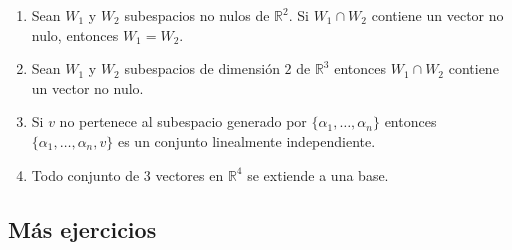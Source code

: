 \documentclass[12pt]{amsart}
\begin{document}
\begin{enumerate}
\begin{enumerate}
	\item Sean $W_1$ y $W_2$ subespacios no nulos de $\mathbb{R}^2$.  Si $W_1 \cap W_2$ contiene un vector no nulo, entonces $W_1 = W_2$.
	\item Sean $W_1$ y $W_2$ subespacios de dimensi\'on $2$ de $\mathbb{R}^3$ entonces $W_1 \cap W_2$ contiene un vector no nulo.
	\item Si $v$ no pertenece al subespacio generado por $\{\alpha_1,\dots ,\alpha_n\}$ entonces $\{\alpha_1,\dots,\alpha_n,v\}$ es un conjunto linealmente independiente.
	\item Todo conjunto de $3$ vectores en $\mathbb{R}^4$ se extiende a una base.
\end{enumerate}

% 

\end{enumerate}

\subsection*{M\'as ejercicios}
\end{document}
